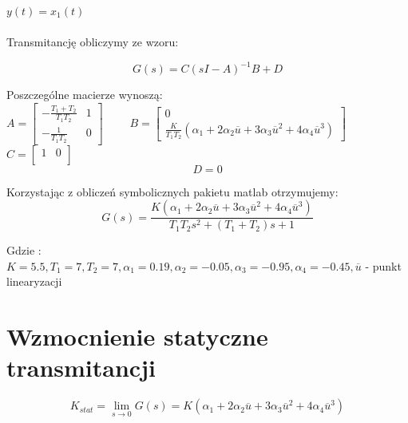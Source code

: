 \documentclass[a4paper, 11pt]{article}
\begin{document}
$y(t) = x_{1}(t)$
\\
\\

\noindent Transmitancję obliczymy ze wzoru: 

$$G(s) = C(sI-A)^{-1}B + D$$

\noindent Poszczególne macierze wynoszą: \\

$ A= \left[
        \begin{array}{cc}
         -\frac{T_1+T_2}{T_1T_2} & 1\\
         -\frac{1}{T_1T_2} & 0
         \end{array}
      \right]
      \qquad $
$ B= \left[
        \begin{array}{c}
         0\\
         \frac{K}{T_{1}T_{2}}(\alpha_1+2\alpha_2\overline{u}+3\alpha_3\overline{u}^2+4\alpha_4\overline{u}^3)
         \end{array}
      \right]
      \qquad $
$ C= \left[
        \begin{array}{cc}
         1& 0\\
         \end{array}
      \right]
      \qquad $
$$D=0$$

\noindent Korzystając z obliczeń symbolicznych pakietu matlab otrzymujemy: 
$$G(s) = \frac{K(\alpha_1+2\alpha_2\overline{u}+3\alpha_3\overline{u}^2+4\alpha_4\overline{u}^3)}{T_1T_2s^2 + (T_1+T_2)s +1}$$

\noindent Gdzie : \\

$K  = 5.5, T_1 = 7, T_2 = 7, \alpha_1 = 0.19, \alpha_2 = -0.05, \alpha_3 = -0.95, \alpha_4 = -0.45,\overline{u}$ - punkt linearyzacji 
\\

\section{Wzmocnienie statyczne transmitancji}
$$K_{stat} = \lim_{s \rightarrow 0} G(s) = K(\alpha_1+2\alpha_2\overline{u}+3\alpha_3\overline{u}^2+4\alpha_4\overline{u}^3)$$
\end{document}
